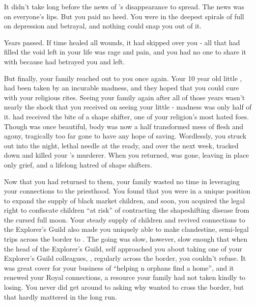 \documentclass[char]{NeptuneBall}
\begin{document}
It didn't take long before the news of \cAriel{}'s disappearance to spread. The news was on everyone's lips. But you paid no heed. You were in the deepest spirals of full on depression and betrayal, and nothing could snap you out of it.

Years passed. If time healed all wounds, it had skipped over you - all that had filled the void left in your life was rage and pain, and you had no one to share it with because \emph{\cAriel{\they}} had betrayed you and left.

But finally, your family reached out to you once again. Your 10 year old little \cSister{\sibling}, \cSister{} had been taken by an incurable madness, and they hoped that you could cure \cSister{\them} with your religious rites. Seeing your family again after all of those years wasn't nearly the shock that you received on seeing your little \cSister{\sibling} - madness was only half of it. \cSister{\They} had received the bite of a shape shifter, one of your religion's most hated foes. Though \cSister{\they} was once beautiful, \cSister{\them} body was now a half transformed mess of flesh and agony, tragically too far gone to have any hope of saving. Wordlessly, you struck out into the night, lethal needle at the ready, and over the next week, tracked down and killed your \cSister{\sibling}'s murderer. When you returned, \cSister{} was gone, leaving in \cSister{\them} place only grief, and a lifelong hatred of shape shifters.

Now that you had returned to them, your family wasted no time in leveraging your connections to the priesthood. You found that you were in a unique position to expand the supply of black market children, and soon, you acquired the legal right to confiscate children ``at risk'' of contracting the shapeshifting disease from the cursed full moon. Your steady supply of children and revived connections to the Explorer's Guild also made you uniquely able to make clandestine, semi-legal trips across the border to \pPacifica{}. The going was slow, however, slow enough that when the head of the Explorer's Guild, \cPlant{\Prince} \cPlant{} \cPlant{\them}self approached you about taking one of your Explorer's Guild colleagues, \cPlant{\their} \cPrincess{\nephew}, \cPrincess{\Prince} \cPrincess{} regularly across the border, you couldn't refuse. It was great cover for your business of ``helping \pAtlantis{}n orphans find a home'', and it renewed your Royal connections, a resource your family had not taken kindly to losing. You never did get around to asking why \cPrincess{\they} wanted to cross the border, but that hardly mattered in the long run.
\end{document}
